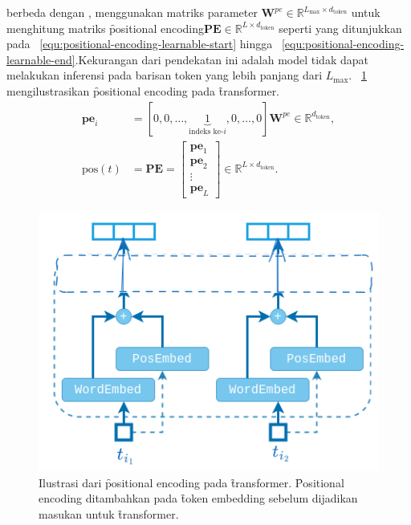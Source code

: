 	berbeda dengan \cite{transformerori}, \cite{bertori} menggunakan matriks parameter $\mathbf{W}^{pe} \in \mathbb{R}^{L_{\max} \times d_{\text{token}}}$ untuk menghitung matriks \f{positional encoding}$\mathbf{PE} \in \mathbb{R}^{L \times d_{\text{token}}}$ seperti yang ditunjukkan pada \equ~\ref{equ:positional-encoding-learnable-start} hingga \equ~\ref{equ:positional-encoding-learnable-end}.Kekurangan dari pendekatan ini adalah model tidak dapat melakukan inferensi pada barisan token yang lebih panjang dari $L_{\max}$. \pic~\ref{fig:positional-encoding} mengilustrasikan \f{positional encoding} pada \f{transformer}.
	\begin{align}
		\label{equ:positional-encoding-learnable-start}
		\mathbf{pe}_{i} &= [0, 0,\dots, \underbrace{1}_{\text{indeks ke-}i},0, \dots, 0] \mathbf{W}^{pe} \in \mathbb{R}^{d_{\text{token}}}, \\
		\label{equ:positional-encoding-learnable-end}
		 \text{pos}(t) &= \mathbf{PE} = \begin{bmatrix}
			\mathbf{pe}_1 \\
			\mathbf{pe}_2 \\
			\vdots \\
			\mathbf{pe}_L
		\end{bmatrix} \in \mathbb{R}^{L \times d_{\text{token}}}.
	\end{align}
	\begin{figure}
		\centering
		\includegraphics[width=1\textwidth]{assets/pics/positional_encoding.png}
		\caption{Ilustrasi dari \f{positional encoding} pada \f{transformer}. \f{Positional encoding} ditambahkan pada \f{token embedding} sebelum dijadikan masukan untuk \f{transformer}.}
		\label{fig:positional-encoding}
	\end{figure}

